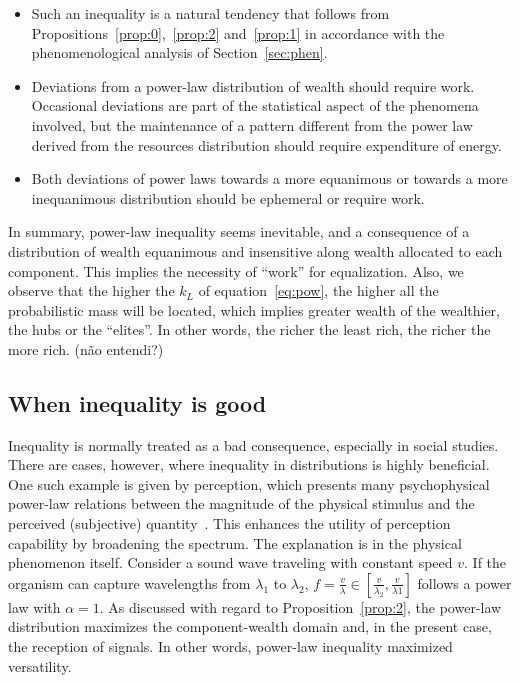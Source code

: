 \documentclass[a4paper, 11pt]{article} %
\begin{document}
\begin{itemize}
	\item Such an inequality is a natural tendency that follows from Propositions~\ref{prop:0},~\ref{prop:2} and~\ref{prop:1} in accordance with the phenomenological analysis of Section~\ref{sec:phen}.
	\item Deviations from a power-law distribution of wealth should require work.
		Occasional deviations are part of the statistical aspect of the phenomena involved, but the maintenance of a pattern different from the power law derived from the resources distribution should require expenditure of energy.
	\item Both deviations of power laws towards a more equanimous or towards a more inequanimous distribution should be ephemeral or require work.
\end{itemize}


In summary, power-law inequality seems inevitable,
and a consequence of a distribution of wealth equanimous and insensitive
along wealth allocated to each component.
This implies the necessity of ``work'' for equalization.
Also, we observe that the higher the $k_L$ of equation~\ref{eq:pow}, the
higher all the probabilistic mass will be located, which
implies greater wealth of the wealthier, the hubs or the ``elites''.
In other words, the richer the least rich,
the richer the more rich. (não entendi?)



\subsection{When inequality is good}
Inequality is normally treated as a bad consequence, especially in social studies. There are cases, however, where inequality in distributions is highly beneficial. One such example is given by perception, which presents many psychophysical power-law relations between the
magnitude of the physical stimulus and the perceived 
(subjective) quantity~\cite{pbook}. This enhances the utility of perception capability by broadening the spectrum.
The explanation is in the physical phenomenon itself. Consider a sound wave traveling with constant speed $v$. If the organism can capture wavelengths from $\lambda_1$ to $\lambda_2$, $f=\frac{v}{\lambda} \in [\frac{v}{\lambda_2},\frac{v}{\lambda1}]$ follows
a power law with $\alpha=1$. As discussed with regard to Proposition~\ref{prop:2}, the power-law distribution
maximizes the component-wealth domain and,
in the present case, the reception of signals. In other words, power-law inequality maximized versatility.
\end{document}
